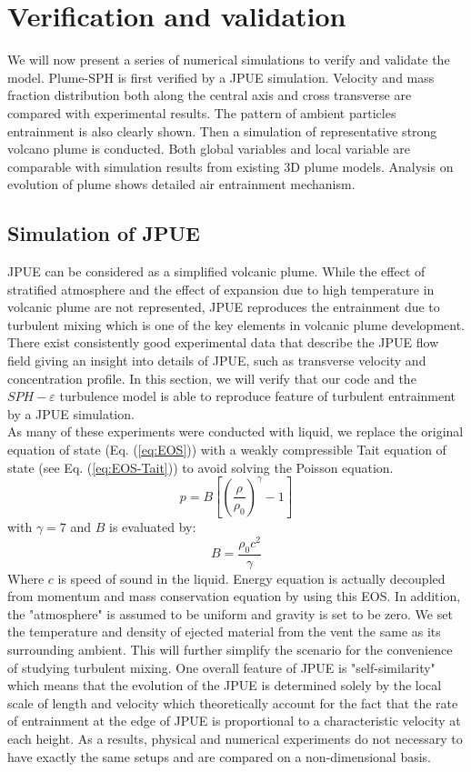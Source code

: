 \documentclass[journal abbreviation, manuscript]{copernicus}
\begin{document}
\section{Verification and validation} \label{sec:verification-validation}
We will now present a series of numerical simulations to verify and validate the model. Plume-SPH is first verified by a JPUE simulation. Velocity and mass fraction distribution both along the central axis and cross transverse are compared with experimental results. The pattern of ambient particles entrainment is also clearly shown. Then a simulation of representative strong volcano plume is conducted. Both global variables and local variable are comparable with simulation results from existing 3D plume models. Analysis on evolution of plume shows detailed air entrainment mechanism. 

\subsection{Simulation of JPUE}
JPUE can be considered as a simplified volcanic plume. While the effect of stratified atmosphere and the effect of expansion due to high temperature in volcanic plume are not represented, JPUE reproduces the entrainment due to turbulent mixing which is one of the key elements in volcanic plume development. There exist consistently good experimental data \citep { list1982turbulent,dimotakis1983structure, papanicolaou1988investigations} that describe the JPUE flow field giving an insight into details of JPUE, such as transverse velocity and concentration profile. In this section, we will verify that our code and the $SPH-\varepsilon$ turbulence model is able to reproduce feature of turbulent entrainment by a JPUE simulation.\\
As many of these experiments were conducted with liquid, we replace the original equation of state (Eq. (\ref{eq:EOS})) with a weakly compressible Tait equation of state \citep {becker2007weakly} (see Eq. (\ref{eq:EOS-Tait})) to avoid solving the Poisson equation.
\begin{equation}
p=B[(\dfrac{\rho}{\rho_0})^{\gamma}-1]
\label{eq:EOS-Tait}
\end{equation}
with $\gamma=7$ and $B$ is evaluated by:
\begin{equation}
B=\dfrac{\rho_0 c^2}{\gamma}
\end{equation}
Where $c$ is speed of sound in the liquid. Energy equation is actually decoupled from momentum and mass conservation equation by using this EOS. In addition, the "atmosphere" is assumed to be uniform and gravity is set to be zero. We set the temperature and density of ejected material from the vent the same as its surrounding ambient. This will further simplify the scenario for the convenience of studying turbulent mixing. One overall feature of JPUE is "self-similarity" which means that the evolution of the JPUE is determined solely by the local scale of length and velocity which theoretically account for the fact that the rate of entrainment at the edge of JPUE is proportional to a characteristic velocity at each height. As a results, physical and numerical experiments do not necessary to have exactly the same setups and are compared on a non-dimensional basis.
\end{document}
